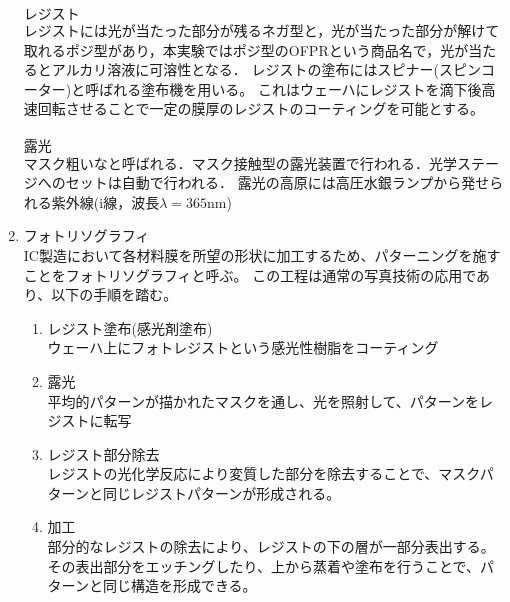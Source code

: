 \documentclass[11pt]{jarticle}
\begin{document}
\begin{enumerate}
				$\boldsymbol{レジスト}$\\
					レジストには光が当たった部分が残るネガ型と，光が当たった部分が解けて取れるポジ型があり，本実験ではポジ型のOFPRという商品名で，光が当たるとアルカリ溶液に可溶性となる．
					レジストの塗布にはスピナー(スピンコーター)と呼ばれる塗布機を用いる。
					これはウェーハにレジストを滴下後高速回転させることで一定の膜厚のレジストのコーティングを可能とする。\\
				\\
				$\boldsymbol{露光}$\\
					マスク粗いなと呼ばれる．マスク接触型の露光装置で行われる．光学ステージへのセットは自動で行われる．
					露光の高原には高圧水銀ランプから発せられる紫外線(i線，波長$\lambda = 365$nm)


			\item フォトリソグラフィ\\
				IC製造において各材料膜を所望の形状に加工するため、パターニングを施すことをフォトリソグラフィと呼ぶ。
				この工程は通常の写真技術の応用であり、以下の手順を踏む。
				\begin{enumerate}
					\item レジスト塗布(感光剤塗布)\\
						ウェーハ上にフォトレジストという感光性樹脂をコーティング
					\item 露光\\
						平均的パターンが描かれたマスクを通し、光を照射して、パターンをレジストに転写
					\item レジスト部分除去\\
						レジストの光化学反応により変質した部分を除去することで、マスクパターンと同じレジストパターンが形成される。
					\item 加工\\
						部分的なレジストの除去により、レジストの下の層が一部分表出する。
						その表出部分をエッチングしたり、上から蒸着や塗布を行うことで、パターンと同じ構造を形成できる。
				\end{enumerate}
		\end{enumerate}
\end{document}

